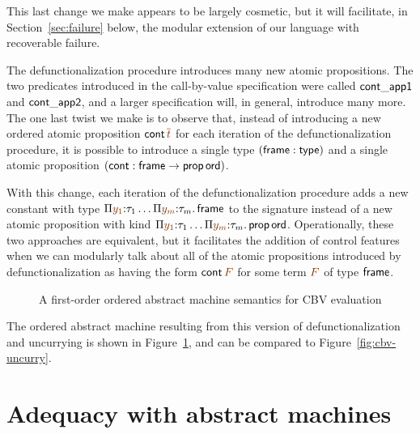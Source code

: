 This last change we make appears to be largely cosmetic, but it will
facilitate, in Section~\ref{sec:failure} below, the modular extension
of our language with recoverable failure.

The defunctionalization procedure introduces many new atomic
propositions. The two predicates introduced in the call-by-value
specification were called ${\sf cont\_app1}$ and ${\sf cont\_app2}$,
and a larger specification will, in general, introduce many more.  The
one last twist we make is to observe that, instead of introducing a
new ordered atomic proposition ${\sf cont}\,\lf{\overline{t}}$ for each
iteration of the defunctionalization procedure, it is possible to
introduce a single type $({\sf frame} : {\sf type})$ and a single
atomic proposition $({\sf cont} : {\sf frame} \rightarrow {\sf
  prop\,ord})$.

With this change, each iteration of the defunctionalization
procedure adds a new constant with type $\Pi \lf{y_1}{:}\tau_1\ldots
\Pi \lf{y_m}{:}\tau_m.\, {\sf frame}$ to the signature instead of a 
new atomic proposition
with kind $\Pi \lf{y_1}{:}\tau_1\ldots \Pi \lf{y_m}{:}\tau_m.\, {\sf
  prop\,ord}$.  Operationally, these two approaches are equivalent, but
it facilitates the addition of control features when we can 
modularly talk about all of the atomic propositions introduced
by defunctionalization as having the form ${\sf cont}\,\lf{F}$ for
some term $\lf{F}$ of type ${\sf frame}$.

\begin{figure}
\caption{A first-order ordered abstract machine semantics for CBV
  evaluation}
\label{fig:cbv-ev-ssos-fun}
\end{figure}

The ordered abstract machine resulting from this version of
defunctionalization and uncurrying is shown in
Figure~\ref{fig:cbv-ev-ssos-fun}, and can be compared to
Figure~\ref{fig:cbv-uncurry}.

\section{Adequacy with abstract machines}
\label{sec:nat-ssos-adequacy}

